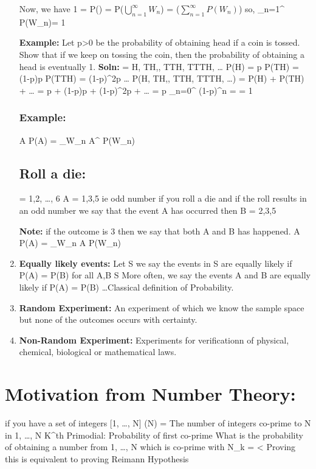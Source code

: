 \documentclass{article}
\begin{document}
\begin{enumerate}
    Now, we have
    1 = P(\omega) = P($\bigcup\limits_{n=1}^{\infty} W_{n}$) = ($\sum\limits_{n=1}^{\infty} P(W_{n})$)
    so, \sum\limits_{n=1}^{\infty} P(W_n)= 1

    \textbf{Example:}
    Let p>0 be the probability of obtaining head if a coin is tossed. Show that if we keep on tossing the coin, then the probability of obtaining a head is eventually 1.
    \textbf{Soln:}
    \omega = {H, TH,, TTH, TTTH, \dots} 
    P(H) = p
    P(TH) = (1-p)p
    P(TTH) = (1-p)^2p
    \dots
    P({H, TH,, TTH, TTTH, \dots}) = P(H) + P(TH) + \dots
    = p + (1-p)p + (1-p)^2p + \dots
    = p \sum\limits_{n=0}^{\infty} (1-p)^n
    =  = 1
        




\subsubsection{Example:}
A \subset \epsilon
P(A) = \sum\limits_{W_n \in A}^{} P(W_n)
\subsection{Roll a die:}
\omega = {1,2, \dots , 6}
A = {1,3,5} ie odd number
if you roll a die and if the roll results in an odd number we say that the event A has occurred 
then B = { 2,3,5}

\textbf{Note:} if the outcome is 3 then we say that both A and B has happened.
A \in \epsilon
P(A) = \sum_{W_n \in A} P(W_n)


        \item \textbf{Equally likely events:} Let S \subset \epsilon we say the events in S are equally likely if P(A) = P(B)
        for all A,B \in S
        More often, we say the events A and B are equally likely if P(A) = P(B) \dots Classical definition of Probability.
        \item \textbf{Random Experiment:} An experiment of which we know the sample space but none of the outcomes occurs with certainty.
        \item \textbf{Non-Random Experiment:} Experiments for verificationn of physical, chemical, biological or mathematical laws.
        



        
\end{enumerate}

\section{Motivation from Number Theory:}
if you have a set of integers [1, \dots, N]
\phi (N) = The number of integers co-prime to N in {1, \dots, N}
K^{th} Primodial: Probability of first co-prime
What is the probability of obtaining a number from {1, \dots, N} which is co-prime  with N_{k} =   < 
Proving this is equivalent to proving Reimann Hypothesis
\end{document}
